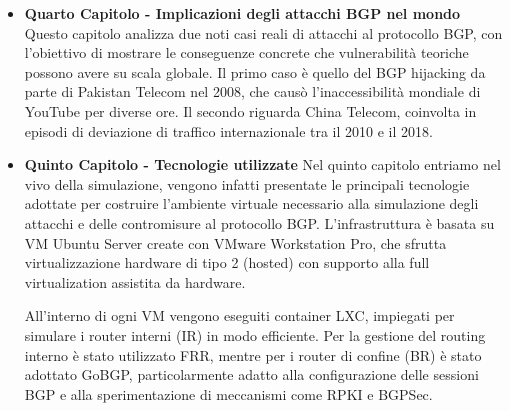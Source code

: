 \documentclass[12pt,a4paper,twoside]{book}
\begin{document}
\begin{itemize}
    Per ciascun attacco vengono analizzati nel dettaglio il funzionamento tecnico, le ripercussioni sul traffico e le vulnerabilità specifiche che vengono sfruttate.
    Successivamente, il capitolo introduce due tecnologie progettate per aumentare la sicurezza di \ac{BGP}: \ac{BGPSec}, che fornisce autenticazione crittografica delle informazioni di routing tramite firme digitali basate su curve ellittiche (ECDSA), e \ac{RPKI}, un’infrastruttura a chiave pubblica che permette di validare l’autorità di un \ac{AS} ad annunciare un determinato prefisso IP. Vengono evidenziate le differenze tra le due soluzioni e i rispettivi ambiti di applicazione.

    Nella parte finale, viene trattato il tema del monitoraggio delle anomalie \ac{BGP} attraverso piattaforme pubbliche come \textit{BGPStream} (di \ac{CAIDA}), \textit{RIPE RIS} e \textit{Route Views}, strumenti fondamentali per l’analisi forense, la diagnosi di incidenti e l’early warning \footnote{L'early warning è la capacità di rilevare tempestivamente anomalie o potenziali attacchi alla rete.} nel routing globale.
    
    \item \textbf{Quarto Capitolo - Implicazioni degli attacchi BGP nel mondo} Questo capitolo analizza due noti casi reali di attacchi al protocollo \ac{BGP}, con l’obiettivo di mostrare le conseguenze concrete che vulnerabilità teoriche possono avere su scala globale. Il primo caso è quello del \ac{BGP} hijacking da parte di Pakistan Telecom nel 2008, che causò l’inaccessibilità mondiale di YouTube per diverse ore. Il secondo riguarda China Telecom, coinvolta in episodi di deviazione di traffico internazionale tra il 2010 e il 2018.
        
    
    \item \textbf{Quinto Capitolo - Tecnologie utilizzate}
    Nel quinto capitolo entriamo nel vivo della simulazione, vengono infatti presentate le principali tecnologie adottate per costruire l’ambiente virtuale necessario alla simulazione degli attacchi e delle contromisure al protocollo \ac{BGP}. L’infrastruttura è basata su \ac{VM} Ubuntu Server create con VMware Workstation Pro, che sfrutta virtualizzazione hardware di tipo 2 (hosted) con supporto alla full virtualization assistita da hardware.

    All’interno di ogni VM vengono eseguiti container LXC, impiegati per simulare i router interni (\ac{IR}) in modo efficiente. Per la gestione del routing interno è stato utilizzato \ac{FRR}, mentre per i router di confine (\ac{BR}) è stato adottato GoBGP, particolarmente adatto alla configurazione delle sessioni \ac{BGP} e alla sperimentazione di meccanismi come \ac{RPKI} e \ac{BGPSec}.


\end{itemize}
\end{document}
